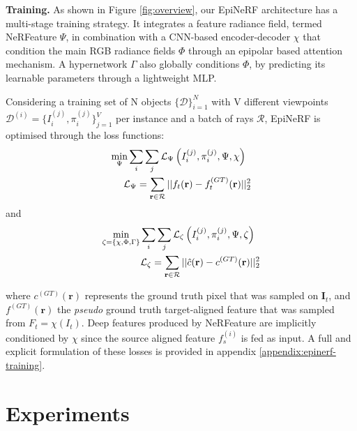\noindent\textbf{Training.} As shown in Figure \ref{fig:overview}, our EpiNeRF architecture has a multi-stage training strategy. It integrates a feature radiance field, termed NeRFeature $\Psi$, in combination with a CNN-based encoder-decoder $\chi$ that condition the main RGB radiance fields $\Phi$ through an epipolar based attention mechanism. A hypernetwork $\Gamma$ also globally conditions $\Phi$, by predicting its learnable parameters through a lightweight \ac{MLP}. 

Considering a training set of N objects $\{\mathcal{D}\}_{i=1}^{N}$ with V different viewpoints $\mathcal{D}^{(i)} = \{I_{i}^{(j)},\pi_{i}^{(j)}\}_{j=1}^{V}$ per instance and a batch of rays $\mathcal{R}$, EpiNeRF is optimised through the loss functions: 
\begin{equation}
\label{eq:nerfeature_loss}
\begin{split}
 \min_{\Psi} \sum_{i}\sum_{j}\mathcal{L}_{\Psi}\left(I_{i}^{(j)},\pi_{i}^{(j)},\Psi,\chi \right) \hspace{.2cm} \\ \hspace{.2cm}\mathcal{L}_{\Psi}= \sum_{\mathbf{r}\in\mathcal{R}} || f_{t}(\mathbf{r}) - f_{t}^{(GT)}(\mathbf{r}) ||_{2}^{2}
\end{split}
\end{equation}
and 
\begin{equation}
\label{eq:epinerf_loss}
\begin{split}
 \min_{\zeta=\{\chi,\Phi,\Gamma\}}\sum_{i}\sum_{j}\mathcal{L}_{\zeta}\left(I_{i}^{(j)},\pi_{i}^{(j)},\Psi,\zeta \right)\hspace{.2cm}  \\ \hspace{.2cm}\mathcal{L}_{\zeta}= \sum_{\mathbf{r}\in\mathcal{R}} || \hat{c}(\mathbf{r}) - c^{(GT)}(\mathbf{r}) ||_{2}^{2}
\end{split}
\end{equation}


\noindent where $c^{(GT)}(\mathbf{r})$ represents the ground truth pixel that was sampled on $\mathbf{I}_{t}$, and $f^{(GT)}(\mathbf{r})$ the \textit{pseudo} ground truth target-aligned feature that was sampled from $F_{t}=\chi(I_{t})$. Deep features produced by NeRFeature are implicitly conditioned by $\chi$ since the source aligned feature $f_s^{(i)}$ is fed as input. A full and explicit formulation of these losses  is provided in appendix \ref{appendix:epinerf-training}. 

\section{Experiments}
\label{subsec:epinerf/experiments}
